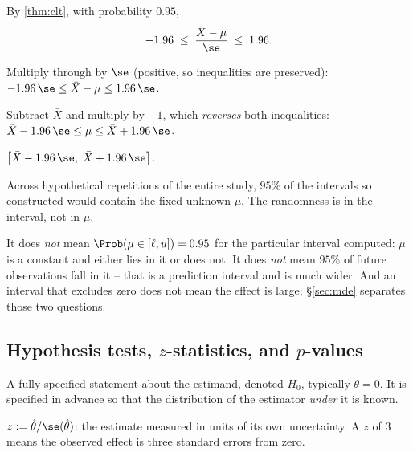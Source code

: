 By \cref{thm:clt}, with probability $0.95$,
\[
-1.96 \;\le\; \frac{\bar X - \mu}{\se} \;\le\; 1.96 .
\]

 Multiply through by $\se$ (positive, so inequalities are
preserved): $-1.96\,\se \le \bar X - \mu \le 1.96\,\se$.

 Subtract $\bar X$ and multiply by $-1$, which
\emph{reverses} both inequalities:
$\bar X - 1.96\,\se \le \mu \le \bar X + 1.96\,\se$.

\begin{definition}
$\big[\bar X - 1.96\,\se,\; \bar X + 1.96\,\se\big]$.
\end{definition}

\begin{remark}
Across hypothetical repetitions of the entire study, $95\%$ of the intervals so
constructed would contain the fixed unknown $\mu$. The randomness is in the
interval, not in $\mu$.
\end{remark}

\begin{remark}
It does \emph{not} mean $\Prob(\mu \in [\ell,u]) = 0.95$ for the particular
interval computed: $\mu$ is a constant and either lies in it or does not. It does
\emph{not} mean $95\%$ of future observations fall in it -- that is a prediction
interval and is much wider. And an interval that excludes zero does not mean the
effect is large; §\ref{sec:mde} separates those two questions.
\end{remark}

\subsection{Hypothesis tests, $z$-statistics, and $p$-values}

\begin{definition}
A fully specified statement about the estimand, denoted $H_0$, typically
$\theta = 0$. It is specified in advance so that the distribution of the
estimator \emph{under} it is known.
\end{definition}

\begin{definition}[$z$-statistic]
$z := \hat\theta/\se(\hat\theta)$: the estimate measured in units of its own
uncertainty. A $z$ of $3$ means the observed effect is three standard errors from
zero.
\end{definition}

